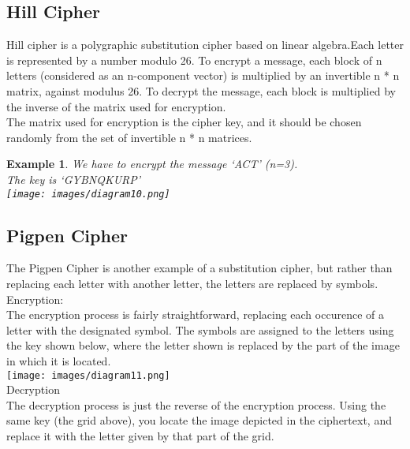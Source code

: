 \documentclass{article}
\newtheorem{ex}{Example}[section]
\begin{document}
\subsection{Hill Cipher}
Hill cipher is a polygraphic substitution cipher based on linear algebra.Each letter is represented by a number modulo 26. To encrypt a message, each block of n letters (considered as an n-component vector) is multiplied by an invertible n * n matrix, against modulus 26. To decrypt the message, each block is multiplied by the inverse of the matrix used for encryption.\\
The matrix used for encryption is the cipher key, and it should be chosen randomly from the set of invertible n * n matrices.
\begin{ex}
We have to encrypt the message ‘ACT’ (n=3).\\
The key is ‘GYBNQKURP’ 
\\
\texttt{[image: images/diagram10.png]}
\end{ex}
\subsection{Pigpen Cipher}
The Pigpen Cipher is another example of a substitution cipher, but rather than replacing each letter with another letter, the letters are replaced by symbols.
\\Encryption:\\
The encryption process is fairly straightforward, replacing each occurence of a letter with the designated symbol. The symbols are assigned to the letters using the key shown below, where the letter shown is replaced by the part of the image in which it is located.\\
\texttt{[image: images/diagram11.png]}
\\ Decryption\\
The decryption process is just the reverse of the encryption process. Using the same key (the grid above), you locate the image depicted in the ciphertext, and replace it with the letter given by that part of the grid.
\end{document}
